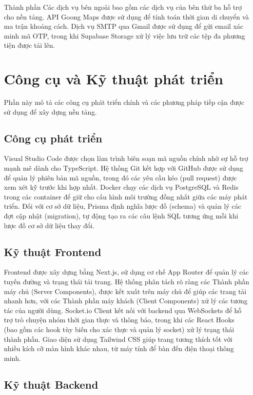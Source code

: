 \documentclass[a4paper,12pt]{report}
\begin{document}
Thành phần Các dịch vụ bên ngoài bao gồm các dịch vụ của bên thứ ba hỗ trợ cho nền tảng. API Goong Maps được sử dụng để tính toán thời gian di chuyển và ma trận khoảng cách. Dịch vụ SMTP qua Gmail được sử dụng để gửi email xác minh mã OTP, trong khi Supabase Storage xử lý việc lưu trữ các tệp đa phương tiện được tải lên.

\section{Công cụ và Kỹ thuật phát triển}

Phần này mô tả các công cụ phát triển chính và các phương pháp tiếp cận được sử dụng để xây dựng nền tảng.

\subsection{Công cụ phát triển}

Visual Studio Code được chọn làm trình biên soạn mã nguồn chính nhờ sự hỗ trợ mạnh mẽ dành cho TypeScript. Hệ thống Git kết hợp với GitHub được sử dụng để quản lý phiên bản mã nguồn, trong đó các yêu cầu kéo (pull request) được xem xét kỹ trước khi hợp nhất. Docker chạy các dịch vụ PostgreSQL và Redis trong các container để giữ cho cấu hình môi trường đồng nhất giữa các máy phát triển. Đối với cơ sở dữ liệu, Prisma định nghĩa lược đồ (schema) và quản lý các đợt cập nhật (migration), tự động tạo ra các câu lệnh SQL tương ứng mỗi khi lược đồ cơ sở dữ liệu thay đổi.

\subsection{Kỹ thuật Frontend}

Frontend được xây dựng bằng Next.js, sử dụng cơ chế App Router để quản lý các tuyến đường và trạng thái tải trang. Hệ thống phân tách rõ ràng các Thành phần máy chủ (Server Components), được kết xuất trên máy chủ để giúp các trang tải nhanh hơn, với các Thành phần máy khách (Client Components) xử lý các tương tác của người dùng. Socket.io Client kết nối với backend qua WebSockets để hỗ trợ trò chuyện nhóm thời gian thực và thông báo, trong khi các React Hooks (bao gồm các hook tùy biến cho xác thực và quản lý socket) xử lý trạng thái thành phần. Giao diện sử dụng Tailwind CSS giúp trang tương thích tốt với nhiều kích cỡ màn hình khác nhau, từ máy tính để bàn đến điện thoại thông minh.

\subsection{Kỹ thuật Backend}
\end{document}
